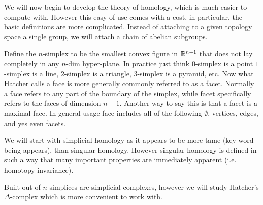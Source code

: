 \documentclass[11pt,leqno,oneside]{amsart}
\newenvironment{dateenv}{
  \vspace{1em}
}{
  \vspace{1em}
}
\newcommand{\mydate}[4]{
  \newdate{#1}{#2}{#3}{#4}
  \begin{dateenv}
    \hfill\displaydate{#1}
  \end{dateenv}
}
\numberwithin{thm}{section}
\begin{document}
We will now begin to develop the theory of homology, which is much
easier to compute with. However this easy of use comes with a cost, in
particular, the basic definitions are more complicated. Instead of
attaching to a given topology space a single group, we will attach a
chain of abelian subgroups.

Define the \(n\)-simplex to be the smallest convex figure in
\({\mathbb R}^{n+1}\) that does not lay completely in any \(n\)-dim
hyper-plane. In practice just think \(0\)-simplex is a point
\(1\)-simplex is a line, \(2\)-simplex is a triangle, \(3\)-simplex is
a pyramid, etc. Now what Hatcher calls a face is more generally
commonly referred to as a facet. Normally a face refers to any part of
the boundary of the simplex, while facet specifically refers to the
faces of dimension \(n-1\). Another way to say this is that a facet is
a maximal face. In general usage face includes all of the following
\(\emptyset\), vertices, edges, and yes even facets.

We will start with simplicial homology as it appears to be more tame
(key word being appears), than singular homology. However singular
homology is defined in such a way that many important properties are
immediately apparent (i.e. homotopy invariance).

Built out of \(n\)-simplices are simplicial-complexes, however we will
study Hatcher's \(\Delta\)-complex which is more convenient to work with. 

\mydate{d14}{27}{2}{2017}
\end{document}
